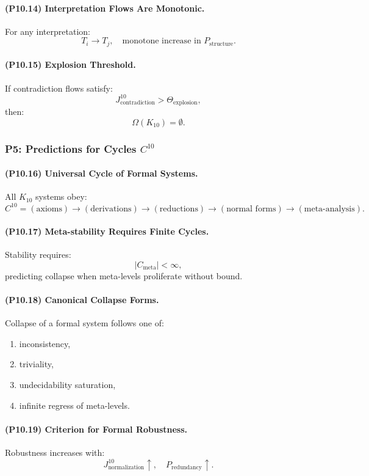 \paragraph{(P10.14) Interpretation Flows Are Monotonic.}
For any interpretation:
\[
T_i \to T_j,
\quad
\text{monotone increase in } P_{\mathrm{structure}}.
\]

\paragraph{(P10.15) Explosion Threshold.}
If contradiction flows satisfy:
\[
J_{\mathrm{contradiction}}^{10} > \Theta_{\mathrm{explosion}},
\]
then:
\[
\Omega(K_{10}) = \emptyset.
\]

\subsubsection{P5: Predictions for Cycles $C^{10}$}

\paragraph{(P10.16) Universal Cycle of Formal Systems.}
All $K_{10}$ systems obey:
\[
C^{10} = 
(\text{axioms}) \to (\text{derivations}) \to 
(\text{reductions}) \to (\text{normal forms}) \to 
(\text{meta-analysis}).
\]

\paragraph{(P10.17) Meta-stability Requires Finite Cycles.}
Stability requires:
\[
|C_{\mathrm{meta}}| < \infty,
\]
predicting collapse when meta-levels proliferate without bound.

\paragraph{(P10.18) Canonical Collapse Forms.}
Collapse of a formal system follows one of:
\begin{enumerate}
    \item inconsistency,
    \item triviality,
    \item undecidability saturation,
    \item infinite regress of meta-levels.
\end{enumerate}

\paragraph{(P10.19) Criterion for Formal Robustness.}
Robustness increases with:
\[
J_{\mathrm{normalization}}^{10} \uparrow,
\quad 
P_{\mathrm{redundancy}} \uparrow.
\]

